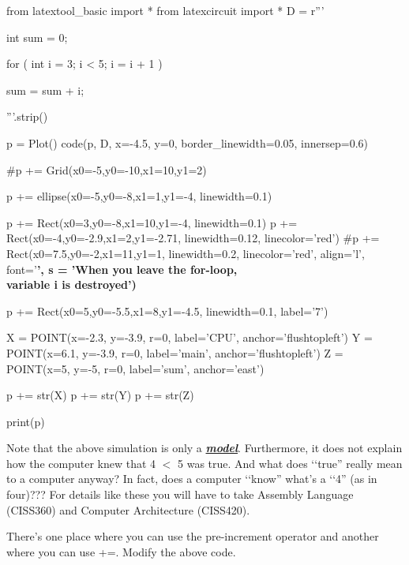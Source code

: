 \begin{python}
from latextool_basic import *
from latexcircuit import *
D = r'''



int sum = 0;

    for ( int i = 3;     i < 5;     i = i + 1 )


        sum = sum + i;



'''.strip()

p = Plot()
code(p, D, x=-4.5, y=0, border_linewidth=0.05, innersep=0.6)

#p += Grid(x0=-5,y0=-10,x1=10,y1=2)

p += ellipse(x0=-5,y0=-8,x1=1,y1=-4, linewidth=0.1)

p += Rect(x0=3,y0=-8,x1=10,y1=-4, linewidth=0.1)
p += Rect(x0=-4,y0=-2.9,x1=2,y1=-2.71, linewidth=0.12, linecolor='red')
#p += Rect(x0=7.5,y0=-2,x1=11,y1=1, linewidth=0.2, linecolor='red', align='l', font='\normalsize\bfseries', s = 'When you leave the for-loop, \\ variable i is destroyed')

p += Rect(x0=5,y0=-5.5,x1=8,y1=-4.5, linewidth=0.1, label='7')

X = POINT(x=-2.3, y=-3.9, r=0, label='CPU', anchor='flushtopleft')
Y = POINT(x=6.1, y=-3.9, r=0, label='main', anchor='flushtopleft')
Z = POINT(x=5, y=-5, r=0, label='sum', anchor='east')

p += str(X)
p += str(Y)
p += str(Z)

print(p)
\end{python}
\sidenote
{
}

Note that the above simulation is only a \emph{\textbf{\underline{model}}}.
Furthermore, it does not explain how the computer knew that 4 $<$ 5 was true. And what does \lq\lq true'' really mean to a computer anyway? In fact, does a computer \lq\lq know'' what's a \lq\lq 4''  (as in four)??? For details like these you will have to take Assembly Language (CISS360) and Computer Architecture (CISS420).


\begin{ex}
There's one place where you can use
the pre-increment operator and another where you can use +=. Modify the
above code.
\end{ex}

